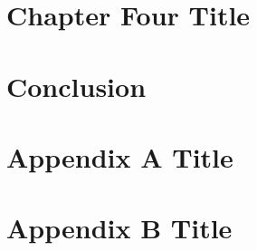 \documentclass[12pt]{report}
\begin{document}

\chapter{Chapter Four Title}\label{chapter:4}

\vspace{-7mm}


\chapter{Conclusion}\label{chapter:Conclusion}

\vspace{-7mm}


\appendix
{}

\chapter{Appendix A Title}
\label{appendix:A}

\vspace{-7mm}

\chapter{Appendix B Title}
\label{appendix:B}

\vspace{-7mm}



\end{document}
